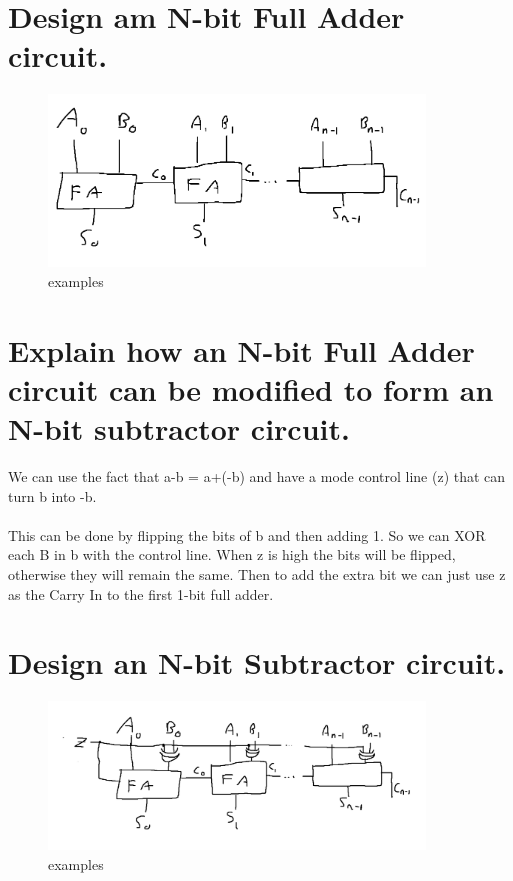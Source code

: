 \documentclass{article}
\begin{document}
\section{Design am N-bit Full Adder circuit.}
\begin{figure}[h]
    \centering
    \includegraphics[width=100mm]{digitalLogic4.PNG}
    \caption{examples}
    \label{fig:my_label}
\end{figure}

\section{Explain how an N-bit Full Adder circuit can be modified to form an N-bit subtractor circuit.}
We can use the fact that a-b = a+(-b) and have a mode control line (z) that can
turn b into -b.\\\\
This can be done by flipping the bits of b and then adding 1. So we can XOR each
B in b with the control line. When z is high the bits will be flipped, otherwise
they will remain the same. Then to add the extra bit we can just use z as the
Carry In to the first 1-bit full adder.
\newpage
\section{Design an N-bit Subtractor circuit.}
\begin{figure}[h]
    \centering
    \includegraphics[width=100mm]{digitalLogic5.PNG}
    \caption{examples}
    \label{fig:my_label}
\end{figure}
\end{document}
